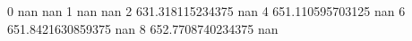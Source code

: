 0 nan nan
1 nan nan
2 631.318115234375 nan
4 651.110595703125 nan
6 651.8421630859375 nan
8 652.7708740234375 nan
